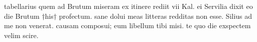 


 tabellarius quem ad Brutum miseram ex itinere rediit vii Kal. ei Servilia dixit eo die Brutum †his† profectum. sane dolui meas litteras redditas non esse. Silius ad me non venerat. causam composui; eum libellum tibi misi. te quo die exspectem velim scire.
